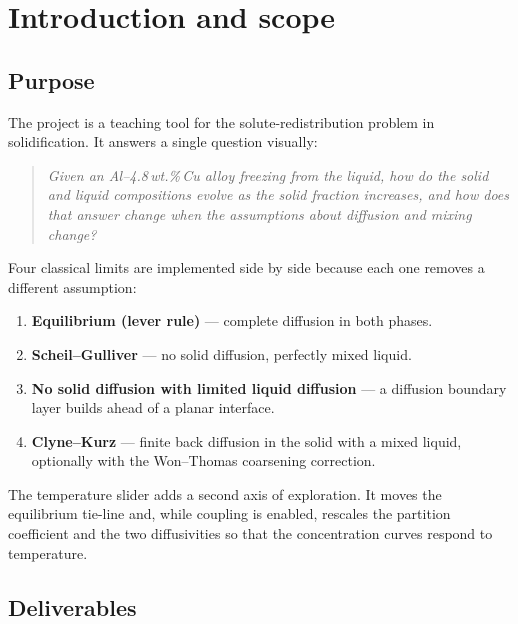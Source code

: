 \documentclass[11pt,a4paper]{article}
\begin{document}
\tableofcontents
\clearpage

\section{Introduction and scope}

\subsection{Purpose}

The project is a teaching tool for the solute-redistribution problem in
solidification. It answers a single question visually:

\begin{quote}
\emph{Given an Al--4.8\,wt.\%\,Cu alloy freezing from the liquid, how do the
solid and liquid compositions evolve as the solid fraction increases, and how
does that answer change when the assumptions about diffusion and mixing
change?}
\end{quote}

Four classical limits are implemented side by side because each one removes a
different assumption:

\begin{enumerate}[leftmargin=1.4em,itemsep=0.15em]
  \item \textbf{Equilibrium (lever rule)} --- complete diffusion in both phases.
  \item \textbf{Scheil--Gulliver} --- no solid diffusion, perfectly mixed liquid.
  \item \textbf{No solid diffusion with limited liquid diffusion} --- a
        diffusion boundary layer builds ahead of a planar interface.
  \item \textbf{Clyne--Kurz} --- finite back diffusion in the solid with a
        mixed liquid, optionally with the Won--Thomas coarsening correction.
\end{enumerate}

The temperature slider adds a second axis of exploration. It moves the
equilibrium tie-line and, while coupling is enabled, rescales the partition
coefficient and the two diffusivities so that the concentration curves respond
to temperature.

\subsection{Deliverables}
\end{document}
